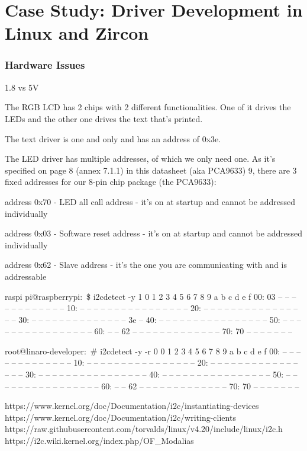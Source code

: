 
\chapter{Case Study: Driver Development in Linux and Zircon} \label{ch:case-study}

\subsection{Hardware Issues}
1.8 vs 5V

The RGB LCD has 2 chips with 2 different functionalities. One of it drives the LEDs and the other one drives the text that’s printed.

The text driver is one and only and has an address of 0x3e.

The LED driver has multiple addresses, of which we only need one. As it’s specified on page 8 (annex 7.1.1) in this datasheet (aka PCA9633) 9, there are 3 fixed addresses for our 8-pin chip package (the PCA9633):

address 0x70 - LED all call address - it’s on at startup and cannot be addressed individually

address 0x03 - Software reset address - it’s on at startup and cannot be addressed individually

address 0x62 - Slave address - it’s the one you are communicating with and is addressable

raspi pi@raspberrypi:~\$ i2cdetect -y 1
    0  1  2  3  4  5  6  7  8  9  a  b  c  d  e  f
00:          03 -- -- -- -- -- -- -- -- -- -- -- --
10: -- -- -- -- -- -- -- -- -- -- -- -- -- -- -- --
20: -- -- -- -- -- -- -- -- -- -- -- -- -- -- -- --
30: -- -- -- -- -- -- -- -- -- -- -- -- -- -- 3e --
40: -- -- -- -- -- -- -- -- -- -- -- -- -- -- -- --
50: -- -- -- -- -- -- -- -- -- -- -- -- -- -- -- --
60: -- -- 62 -- -- -- -- -- -- -- -- -- -- -- -- --
70: 70 -- -- -- -- -- -- --


root@linaro-developer:~# i2cdetect -y -r 0
    0  1  2  3  4  5  6  7  8  9  a  b  c  d  e  f
00:          -- -- -- -- -- -- -- -- -- -- -- -- --
10: -- -- -- -- -- -- -- -- -- -- -- -- -- -- -- --
20: -- -- -- -- -- -- -- -- -- -- -- -- -- -- -- --
30: -- -- -- -- -- -- -- -- -- -- -- -- -- -- -- --
40: -- -- -- -- -- -- -- -- -- -- -- -- -- -- -- --
50: -- -- -- -- -- -- -- -- -- -- -- -- -- -- -- --
60: -- -- 62 -- -- -- -- -- -- -- -- -- -- -- -- --
70: 70 -- -- -- -- -- -- --

https://www.kernel.org/doc/Documentation/i2c/instantiating-devices
https://www.kernel.org/doc/Documentation/i2c/writing-clients
https://raw.githubusercontent.com/torvalds/linux/v4.20/include/linux/i2c.h
https://i2c.wiki.kernel.org/index.php/OF_Modalias

